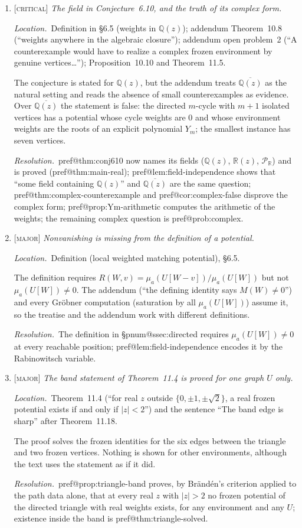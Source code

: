 \documentclass[11pt]{amsart}
\makeatletter
\newcommand{\pref}[1]{\csname pref@#1\endcsname}
\newcommand{\pnum}[1]{\csname pnum@#1\endcsname}
\newcommand{\Qz}{\mathbb{Q}(z)}
\newcommand{\Rz}{\mathbb{R}(z)}
\newcommand{\Qzbar}{\overline{\mathbb{Q}(z)}}
\newcommand{\Puis}{\mathcal{P}_{\mathbb{R}}}
\newcommand{\sev}[1]{\textsc{[#1]}}
\newcommand{\fix}{\par\noindent\emph{Resolution.}\ }
\newcommand{\where}[1]{\par\noindent\emph{Location.}\ #1\par\noindent}
\makeatother
\begin{document}
\begin{enumerate}[label=\textbf{I.\arabic*},leftmargin=*,widest=I.22]

\item \sev{critical} \emph{The field in Conjecture~6.10, and the truth of its complex form.}
\where{Definition in \S6.5 (weights in $\Qz$); addendum Theorem~10.8 (``weights anywhere in the algebraic closure''); addendum open problem~2 (``A counterexample would have to realize a complex frozen environment by genuine vertices\dots''); Proposition~10.10 and Theorem~11.5.}
The conjecture is stated for $\Qz$, but the addendum treats $\Qzbar$ as the natural setting and reads the absence of small counterexamples as evidence. Over $\Qzbar$ the statement is false: the directed $m$-cycle with $m+1$ isolated vertices has a potential whose cycle weights are $0$ and whose environment weights are the roots of an explicit polynomial $Y_m$; the smallest instance has seven vertices.
\fix \pref{thm:conj610} now names its fields ($\Qz$, $\Rz$, $\Puis$) and is proved (\pref{thm:main-real}); \pref{lem:field-independence} shows that ``some field containing $\Qz$'' and $\Qzbar$ are the same question; \pref{thm:complex-counterexample} and \pref{cor:complex-false} disprove the complex form; \pref{prop:Ym-arithmetic} computes the arithmetic of the weights; the remaining complex question is \pref{prob:complex}.

\item \sev{major} \emph{Nonvanishing is missing from the definition of a potential.}
\where{Definition (local weighted matching potential), \S6.5.}
The definition requires $R(W,v)=\mu_a(U[W-v])/\mu_a(U[W])$ but not $\mu_a(U[W])\neq0$. The addendum (``the defining identity says $M(W)\neq0$'') and every Gr\"obner computation (saturation by all $\mu_a(U[W])$) assume it, so the treatise and the addendum work with different definitions.
\fix The definition in \S\pnum{ssec:directed} requires $\mu_a(U[W])\neq0$ at every reachable position; \pref{lem:field-independence} encodes it by the Rabinowitsch variable.

\item \sev{major} \emph{The band statement of Theorem~11.4 is proved for one graph $U$ only.}
\where{Theorem~11.4 (``for real $z$ outside $\{0,\pm1,\pm\sqrt2\}$, a real frozen potential exists if and only if $|z|<2$'') and the sentence ``The band edge is sharp'' after Theorem~11.18.}
The proof solves the frozen identities for the six edges between the triangle and two frozen vertices. Nothing is shown for other environments, although the text uses the statement as if it did.
\fix \pref{prop:triangle-band} proves, by Br\"and\'en's criterion applied to the path data alone, that at every real $z$ with $|z|>2$ no frozen potential of the directed triangle with real weights exists, for any environment and any $U$; existence inside the band is \pref{thm:triangle-solved}.


\end{enumerate}
\end{document}
